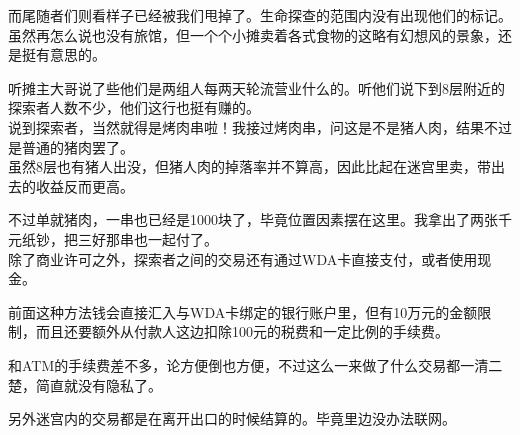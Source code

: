 而尾随者们则看样子已经被我们甩掉了。生命探查的范围内没有出现他们的标记。\\

虽然再怎么说也没有旅馆，但一个个小摊卖着各式食物的这略有幻想风的景象，还是挺有意思的。

听摊主大哥说了些他们是两组人每两天轮流营业什么的。听他们说下到8层附近的探索者人数不少，他们这行也挺有赚的。\\

说到探索者，当然就得是烤肉串啦！我接过烤肉串，问这是不是猪人肉，结果不过是普通的猪肉罢了。\\

虽然8层也有猪人出没，但猪人肉的掉落率并不算高，因此比起在迷宫里卖，带出去的收益反而更高。

不过单就猪肉，一串也已经是1000块了，毕竟位置因素摆在这里。我拿出了两张千元纸钞，把三好那串也一起付了。\\

除了商业许可之外，探索者之间的交易还有通过WDA卡直接支付，或者使用现金。

前面这种方法钱会直接汇入与WDA卡绑定的银行账户里，但有10万元的金额限制，而且还要额外从付款人这边扣除100元的税费和一定比例的手续费。

和ATM的手续费差不多，论方便倒也方便，不过这么一来做了什么交易都一清二楚，简直就没有隐私了。

另外迷宫内的交易都是在离开出口的时候结算的。毕竟里边没办法联网。\\

